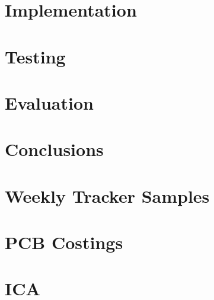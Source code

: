 \documentclass[a4paper, 12pt]{report}
\begin{document}
\chapter{Implementation}





\chapter{Testing}

\chapter{Evaluation}

\chapter{Conclusions}




\appendix
\chapter{Weekly Tracker Samples}

\chapter{PCB Costings}

\chapter{ICA}

\end{document}
